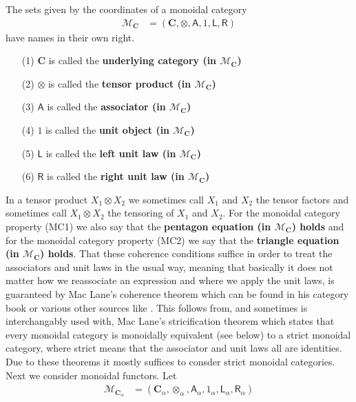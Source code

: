 The sets given by the coordinates of a monoidal category
\begin{align*}
  \mathcal{M}_{\mathbf{C}}
  &=
  \left(
    \mathbf{C},
    \otimes,
    \mathsf{A},
    1,
    \mathsf{L},
    \mathsf{R}
  \right)
\end{align*}
have names in their own right.
\begin{enumerate}
\item[(1)]
$\mathbf{C}$ is called the \textbf{underlying category (in $\mathcal{M}_{\mathbf{C}}$)}
\item[(2)]
$\otimes$ is called the \textbf{tensor product (in $\mathcal{M}_{\mathbf{C}}$)}
\item[(3)]
$\mathsf{A}$ is called the \textbf{associator (in $\mathcal{M}_{\mathbf{C}}$)}
\item[(4)]
$1$ is called the \textbf{unit object (in $\mathcal{M}_{\mathbf{C}}$)}
\item[(5)]
$\mathsf{L}$ is called the \textbf{left unit law (in $\mathcal{M}_{\mathbf{C}}$)}
\item[(6)]
$\mathsf{R}$ is called the \textbf{right unit law (in $\mathcal{M}_{\mathbf{C}}$)}
\end{enumerate}
In a tensor product $X_{1} \otimes X_{2}$ we sometimes call $X_{1}$ and $X_{2}$ the tensor factors and sometimes call $X_{1} \otimes X_{2}$ the tensoring of $X_{1}$ and $X_{2}$. For the monoidal category property (MC1) we also say that the \textbf{pentagon equation (in $\mathcal{M}_{\mathbf{C}}$) holds} and for the monoidal category property (MC2) we say that the \textbf{triangle equation (in $\mathcal{M}_{\mathbf{C}}$) holds}. That these coherence conditions suffice in order to treat the associators and unit laws in the usual way, meaning that basically it does not matter how we reassociate an expression and where we apply the unit laws, is guaranteed by Mac Lane's coherence theorem which can be found in his category book \cite{e837ef86} or various other sources like \cite{5175de60}. This follows from, and sometimes is interchangably used with, Mac Lane's stricification theorem which states that every monoidal category is monoidally equivalent (see below) to a strict monoidal category, where strict means that the associator and unit laws all are identities. Due to these theorems it mostly suffices to consder strict monoidal categories.
\\
Next we consider monoidal functors. Let
\begin{align*}
  \mathcal{M}_{\mathbf{C}_{\alpha}}
  &=
  \left(
    \mathbf{C}_{\alpha},
    \otimes_{\alpha},
    \mathsf{A}_{\alpha},
    1_{\alpha},
    \mathsf{L}_{\alpha},
    \mathsf{R}_{\alpha}
  \right)
\end{align*}
